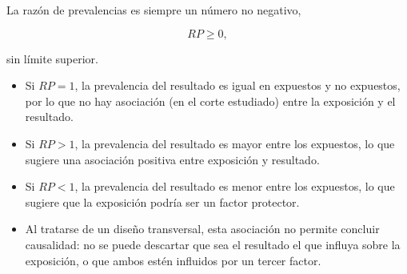 \documentclass[
  spanish,
  a4paper,
]{scrreport}
\providecommand{\tightlist}{%
  \setlength{\itemsep}{0pt}\setlength{\parskip}{0pt}}
\theoremstyle{definition}
\theoremstyle{definition}
\theoremstyle{remark}
\begin{document}
\begin{tcolorbox}[enhanced jigsaw, arc=.35mm, bottomrule=.15mm, bottomtitle=1mm, breakable, colback=white, colbacktitle=quarto-callout-important-color!10!white, colframe=quarto-callout-important-color-frame, coltitle=black, left=2mm, leftrule=.75mm, opacityback=0, opacitybacktitle=0.6, rightrule=.15mm, title=\textcolor{quarto-callout-important-color}{\faExclamation}\hspace{0.5em}{Importante}, titlerule=0mm, toprule=.15mm, toptitle=1mm]

La razón de prevalencias es siempre un número no negativo,

\[RP \geq 0,\]

sin límite superior.

\end{tcolorbox}

\begin{tcolorbox}[enhanced jigsaw, arc=.35mm, bottomrule=.15mm, bottomtitle=1mm, breakable, colback=white, colbacktitle=quarto-callout-note-color!10!white, colframe=quarto-callout-note-color-frame, coltitle=black, left=2mm, leftrule=.75mm, opacityback=0, opacitybacktitle=0.6, rightrule=.15mm, title=\textcolor{quarto-callout-note-color}{\faInfo}\hspace{0.5em}{Interpretación}, titlerule=0mm, toprule=.15mm, toptitle=1mm]

\begin{itemize}
\tightlist
\item
  Si \(RP=1\), la prevalencia del resultado es igual en expuestos y no
  expuestos, por lo que no hay asociación (en el corte estudiado) entre
  la exposición y el resultado.
\item
  Si \(RP>1\), la prevalencia del resultado es mayor entre los
  expuestos, lo que sugiere una asociación positiva entre exposición y
  resultado.
\item
  Si \(RP<1\), la prevalencia del resultado es menor entre los
  expuestos, lo que sugiere que la exposición podría ser un factor
  protector.
\item
  Al tratarse de un diseño transversal, esta asociación no permite
  concluir causalidad: no se puede descartar que sea el resultado el que
  influya sobre la exposición, o que ambos estén influidos por un tercer
  factor.
\end{itemize}

\end{tcolorbox}
\end{document}
